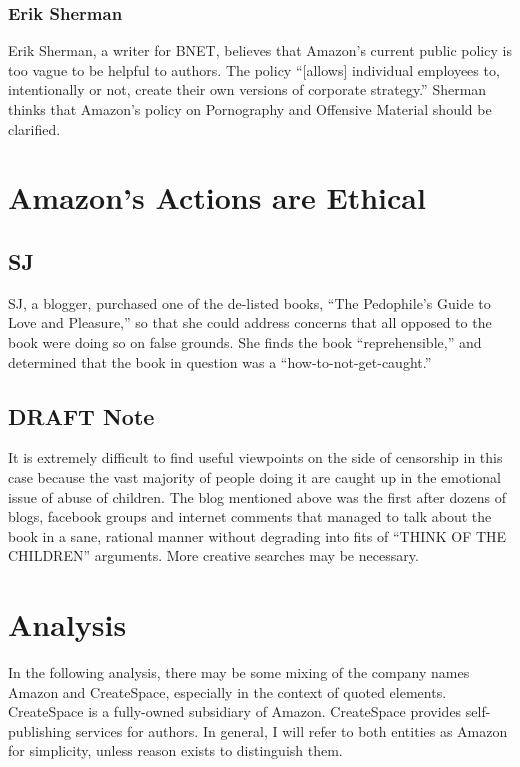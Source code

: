 \documentclass[11pt]{article}
\begin{document}
\begin{multicols}{2}
\subsubsection{Erik Sherman}
Erik Sherman, a writer for BNET, believes that Amazon's current public policy is too vague to be helpful to authors.  The policy  ``[allows] individual employees to, intentionally or not, create their own versions of corporate strategy.'' \cite{ShermanAmazonExecs} Sherman thinks that Amazon's policy on Pornography and Offensive Material should be clarified.

\section{Amazon's Actions are Ethical}
\subsection{SJ}
SJ, a blogger, purchased one of the de-listed books, ``The Pedophile's Guide to Love and Pleasure,'' so that she could address concerns that all opposed to the book were doing so on false grounds.  She finds the book ``reprehensible,'' and determined that the book in question was a ``how-to-not-get-caught.'' \cite{iasshole}
\subsection{DRAFT Note}
It is extremely difficult to find useful viewpoints on the side of censorship in this case because the vast majority of people doing it are caught up in the emotional issue of abuse of children.  The blog mentioned above was the first after dozens of blogs, facebook groups and internet comments that managed to talk about the book in a sane, rational manner without degrading into fits of ``THINK OF THE CHILDREN'' arguments. More creative searches may be necessary.

\section{Analysis}
In the following analysis, there may be some mixing of the company names Amazon and CreateSpace, especially in the context of quoted elements.  CreateSpace is a fully-owned subsidiary of Amazon.  CreateSpace provides self-publishing services for authors.  In general, I will refer to both entities as Amazon for simplicity, unless reason exists to distinguish them.


\end{multicols}
\end{document}
